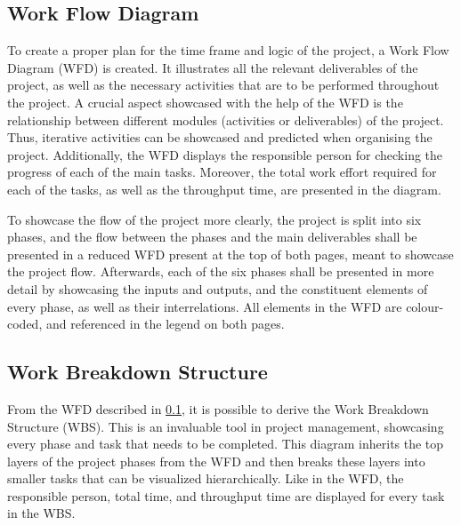 \subsection{Work Flow Diagram}\label{sec:wfd}
To create a proper plan for the time frame and logic of the project, a Work Flow Diagram (WFD) is created.
It illustrates all the relevant deliverables of the project, as well as the necessary activities that are to be performed throughout the project.
A crucial aspect showcased with the help of the WFD is the relationship between different modules (activities or deliverables) of the project.
Thus, iterative activities can be showcased and predicted when organising the project.
Additionally, the WFD displays the responsible person for checking the progress of each of the main tasks.
Moreover, the total work effort required for each of the tasks, as well as the throughput time, are presented in the diagram.

To showcase the flow of the project more clearly, the project is split into six phases, and the flow between the phases and the main deliverables shall be presented in a reduced WFD present at the top of both pages, meant to showcase the project flow.
Afterwards, each of the six phases shall be presented in more detail by showcasing the inputs and outputs, and the constituent elements of every phase, as well as their interrelations.
All elements in the WFD are colour-coded, and referenced in the legend on both pages.


\subsection{Work Breakdown Structure}\label{sec:wbs}
From the WFD described in \cref{sec:wfd}, it is possible to derive the Work Breakdown Structure (WBS). This is an invaluable tool in project management, showcasing every phase and task that needs to be completed.
This diagram inherits the top layers of the project phases from the WFD and then breaks these layers into smaller tasks that can be visualized hierarchically. 
Like in the WFD, the responsible person, total time, and throughput time are displayed for every task in the WBS.

